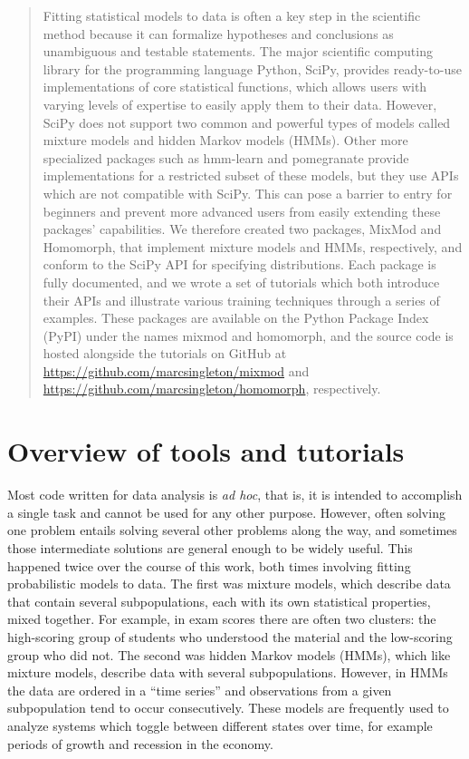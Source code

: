\begin{abstract}
\noindent
Fitting statistical models to data is often a key step in the scientific method because it can formalize hypotheses and conclusions as unambiguous and testable statements. The major scientific computing library for the programming language Python, SciPy, provides ready-to-use implementations of core statistical functions, which allows users with varying levels of expertise to easily apply them to their data. However, SciPy does not support two common and powerful types of models called mixture models and hidden Markov models (HMMs). Other more specialized packages such as hmm-learn and pomegranate provide implementations for a restricted subset of these models, but they use APIs which are not compatible with SciPy. This can pose a barrier to entry for beginners and prevent more advanced users from easily extending these packages' capabilities. We therefore created two packages, MixMod and Homomorph, that implement mixture models and HMMs, respectively, and conform to the SciPy API for specifying distributions. Each package is fully documented, and we wrote a set of tutorials which both introduce their APIs and illustrate various training techniques through a series of examples. These packages are available on the Python Package Index (PyPI) under the names mixmod and homomorph, and the source code is hosted alongside the tutorials on GitHub at \url{https://github.com/marcsingleton/mixmod} and \url{https://github.com/marcsingleton/homomorph}, respectively.
\end{abstract}

\section{Overview of tools and tutorials}
Most code written for data analysis is \textit{ad hoc}, that is, it is intended to accomplish a single task and cannot be used for any other purpose. However, often solving one problem entails solving several other problems along the way, and sometimes those intermediate solutions are general enough to be widely useful. This happened twice over the course of this work, both times involving fitting probabilistic models to data. The first was mixture models, which describe data that contain several subpopulations, each with its own statistical properties, mixed together. For example, in exam scores there are often two clusters: the high-scoring group of students who understood the material and the low-scoring group who did not. The second was hidden Markov models (HMMs), which like mixture models, describe data with several subpopulations. However, in HMMs the data are ordered in a ``time series'' and observations from a given subpopulation tend to occur consecutively. These models are frequently used to analyze systems which toggle between different states over time, for example periods of growth and recession in the economy.

